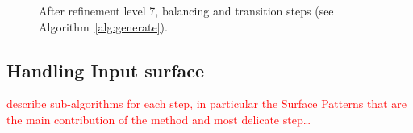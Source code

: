 \documentclass[10pt]{article}
\begin{document}
\begin{figure}[htb]
\centering
 \caption{After refinement level 7, balancing and transition steps (see Algorithm~\ref{alg:generate}).}
\label{fig:generate7}
\end{figure}


\subsection{Handling Input surface}

\textcolor{red}{describe sub-algorithms for each step, in particular the Surface Patterns that are the main contribution of the method and most delicate step\ldots}
\end{document}
